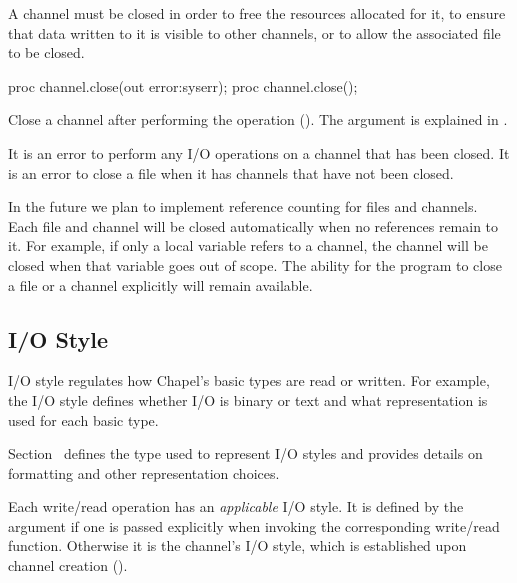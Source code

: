 A channel must be closed in order to free the resources allocated for it,
to ensure that data written to it is visible to other channels,
or to allow the associated file to be closed.

\begin{protohead}
proc channel.close(out error:syserr);
proc channel.close();
\end{protohead}
\begin{protobody}
Close a channel after performing the  operation
().
The  argument is explained in .
\end{protobody}

It is an error to perform any I/O operations on a channel
that has been closed.
It is an error to close a file when it has channels that
have not been closed.

\begin{future}
In the future we plan to implement reference counting for files
and channels. Each file and channel will be closed automatically
when no references remain to it. For example, if only a local
variable refers to a channel, the channel will be closed
when that variable goes out of scope.
The ability for the program to close a file or a channel
explicitly will remain available.
\end{future}


\subsection{I/O Style}
\label{IO_io_style}

I/O style regulates how Chapel's basic types are read or written.
For example, the I/O style defines whether I/O is binary or text
and what representation is used for each basic type.

Section~ defines the  type
used to represent I/O styles and provides details on formatting
and other representation choices.

Each write/read operation has an \emph{applicable} I/O style.
It is defined by the  argument if one is passed explicitly
when invoking the corresponding write/read function.
Otherwise it is the channel's I/O style, which is established
upon channel creation ().


